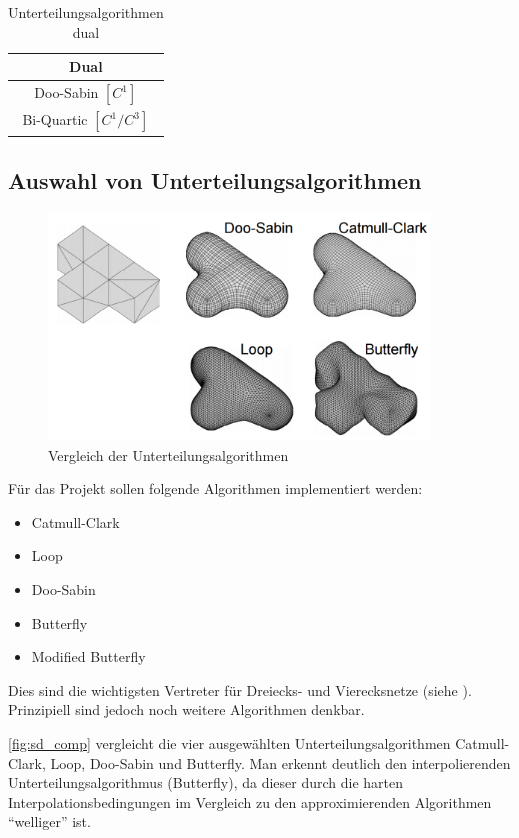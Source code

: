 \begin{table}
\center
\caption{Unterteilungsalgorithmen dual \cite[S. 79ff]{Zorin.subdivcourse}}
\label{tab:sd_comp_dual}
\begin{tabular}{c}
\\
\hline
\textbf{Dual}\\
\hline
Doo-Sabin \([C^1]\) \\
Bi-Quartic \([C^1/C^3]\) \\
\end{tabular}
\end{table}

\subsection{Auswahl von Unterteilungsalgorithmen}

\begin{figure}
  \centering
  \includegraphics[width=0.9\textwidth]{content/media/sd_overview.png}
  \caption{Vergleich der Unterteilungsalgorithmen \cite{Standford.24.07.2015}}
  \label{fig:sd_comp}
\end{figure}

Für das Projekt sollen folgende Algorithmen implementiert werden:
\begin{itemize}
	\item Catmull-Clark
	\item Loop
	\item Doo-Sabin
	\item Butterfly
	\item Modified Butterfly
\end{itemize}
Dies sind die wichtigsten Vertreter für Dreiecks- und Vierecksnetze
(siehe \cite[S. 65ff]{Zorin.subdivcourse} \cite{Zorin01aunified}).
Prinzipiell sind jedoch noch weitere Algorithmen denkbar.

\autoref{fig:sd_comp} vergleicht die vier ausgewählten
Unterteilungsalgorithmen Catmull-Clark, Loop, Doo-Sabin und Butterfly.
Man erkennt deutlich den interpolierenden Unterteilungsalgorithmus (Butterfly),
da dieser durch die harten Interpolationsbedingungen im
Vergleich zu den approximierenden Algorithmen \enquote{welliger} ist.
\cite{Zorin.subdivcourse}





